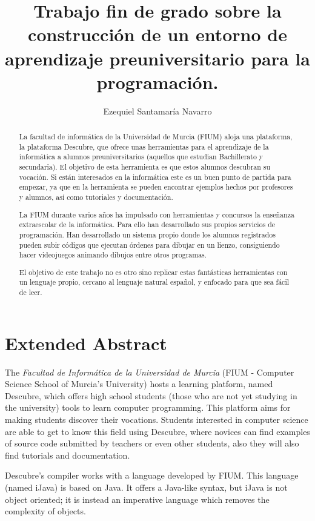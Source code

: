 \documentclass{report}
\author{Ezequiel Santamaría Navarro}
\title{Trabajo fin de grado sobre la construcción de un entorno de aprendizaje preuniversitario para la programación.}
\begin{document}
	\maketitle
	\tableofcontents
	\listoffigures
		
	\begin{abstract}
		La facultad de informática de la Universidad de Murcia (FIUM) aloja una plataforma, la plataforma Descubre, que ofrece unas herramientas para el aprendizaje de la informática a alumnos preuniversitarios (aquellos que estudian Bachillerato y secundaria). El objetivo de esta herramienta es que estos alumnos descubran su vocación. Si están interesados en la informática este es un buen punto de partida para empezar, ya que en la herramienta se pueden encontrar ejemplos hechos por profesores y alumnos, así como tutoriales y documentación. 
		
		La FIUM durante varios años ha impulsado con herramientas y concursos la enseñanza extraescolar de la informática. Para ello han desarrollado sus propios servicios de programación. Han desarrollado un sistema propio donde los alumnos registrados pueden subir códigos que ejecutan órdenes para dibujar en un lienzo, consiguiendo hacer videojuegos animando dibujos entre otros programas.
		
		El objetivo de este trabajo no es otro sino replicar estas fantásticas herramientas con un lenguaje propio, cercano al lenguaje natural español, y enfocado para que sea fácil de leer. 
	\end{abstract}
	
	\chapter{Extended Abstract}
	
	The \textit{Facultad de Informática de la Universidad de Murcia} (FIUM - Computer Science School of Murcia's University) hosts a learning platform, named Descubre, which offers high school students (those who are not yet studying in the university) tools to learn computer programming. This platform aims for making students discover their vocations. Students interested in computer science are able to get to know this field using Descubre, where novices can find examples of source code submitted by teachers or even other students, also they will also find tutorials and documentation. 
	
	Descubre's compiler works with a language developed by FIUM. This language (named iJava) is based on Java. It offers a Java-like syntax, but iJava is not object oriented; it is instead an imperative language which removes the complexity of objects.
	
\end{document}

